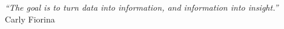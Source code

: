 \cleardoublepage
\thispagestyle{plain}

\vspace*{8cm}

\begin{flushright}
\textsl{``The goal is to turn data into information, and information into insight.''} \\
\vspace*{1.5cm}
Carly Fiorina
\end{flushright}
